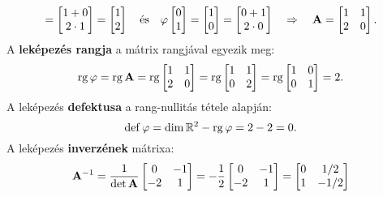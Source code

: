 \documentclass{szb-practice}
\begin{document}
\begin{example}
$$    = \begin{bmatrix} 1 + 0 \\ 2 \cdot 1 \end{bmatrix}
    = \begin{bmatrix} 1 \\ 2 \end{bmatrix}
    \quad \text{és} \quad
    \varphi \begin{bmatrix} 0 \\ 1 \end{bmatrix}
    = \begin{bmatrix} 1 \\ 0 \end{bmatrix}
    = \begin{bmatrix} 0 + 1 \\ 2 \cdot 0 \end{bmatrix}
    \quad \Rightarrow \quad
    \mathbf{A} = \begin{bmatrix}
      1 & 1 \\
      2 & 0
    \end{bmatrix}
    \text.
  $$
  A \textbf{leképezés rangja} a mátrix rangjával egyezik meg:
  $$
    \operatorname{rg} \varphi = \operatorname{rg} \mathbf{A}
    = \operatorname{rg} \begin{bmatrix}
      1 & 1 \\
      2 & 0
    \end{bmatrix}
    = \operatorname{rg} \begin{bmatrix}
      1 & 1 \\
      0 & 2
    \end{bmatrix}
    = \operatorname{rg} \begin{bmatrix}
      1 & 0 \\
      0 & 1
    \end{bmatrix}
    = 2
    \text.
  $$
  A leképezés \textbf{defektusa} a rang-nullitás tétele alapján:
  $$
    \operatorname{def} \varphi
    = \dim \mathbb R^2 - \operatorname{rg} \varphi
    = 2 - 2
    = 0
    \text.
  $$
  A leképezés \textbf{inverzének} mátrixa:
  $$
    \mathbf{A}^{-1}
    = \frac{1}{\det \mathbf{A}} \begin{bmatrix}
      0  & -1 \\
      -2 & 1
    \end{bmatrix}
    = -\frac{1}{2} \begin{bmatrix}
      0  & -1 \\
      -2 & 1
    \end{bmatrix}
    = \begin{bmatrix}
      0 & 1/2  \\
      1 & -1/2
    \end{bmatrix}
$$
\end{example}
\end{document}
